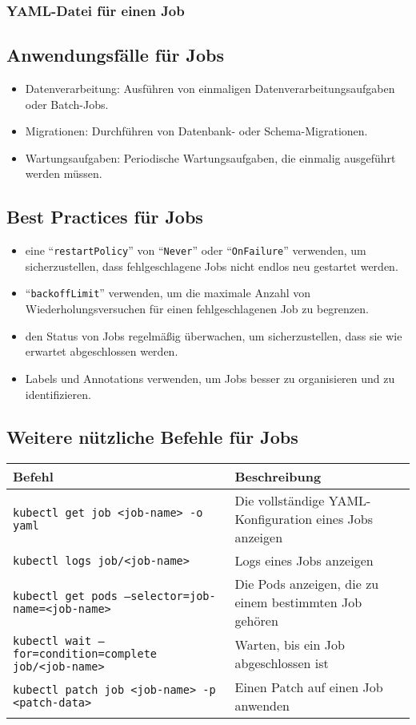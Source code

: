 \subsubsection{YAML-Datei für einen Job}


\subsection{Anwendungsfälle für Jobs}
\begin{itemize}
    \item Datenverarbeitung: Ausführen von einmaligen Datenverarbeitungsaufgaben oder Batch-Jobs.
    \item Migrationen: Durchführen von Datenbank- oder Schema-Migrationen.
    \item Wartungsaufgaben: Periodische Wartungsaufgaben, die einmalig ausgeführt werden müssen.
\end{itemize}

\subsection{Best Practices für Jobs}
\begin{itemize}
    \item eine \enquote{\texttt{restartPolicy}} von \enquote{\texttt{Never}} oder \enquote{\texttt{OnFailure}} verwenden, um sicherzustellen, dass fehlgeschlagene Jobs nicht endlos neu gestartet werden.
    \item \enquote{\texttt{backoffLimit}} verwenden, um die maximale Anzahl von Wiederholungsversuchen für einen fehlgeschlagenen Job zu begrenzen.
    \item den Status von Jobs regelmäßig überwachen, um sicherzustellen, dass sie wie erwartet abgeschlossen werden.
    \item Labels und Annotations verwenden, um Jobs besser zu organisieren und zu identifizieren.
\end{itemize}

\subsection{Weitere nützliche Befehle für Jobs}
\begin{tabular}{|p{}|p{}|}
\hline
\textbf{Befehl} & \textbf{Beschreibung} \\
\hline
\texttt{kubectl get job <job-name> -o yaml} & Die vollständige YAML-Konfiguration eines Jobs anzeigen \\
\texttt{kubectl logs job/<job-name>} & Logs eines Jobs anzeigen \\
\texttt{kubectl get pods --selector=job-name=<job-name>} & Die Pods anzeigen, die zu einem bestimmten Job gehören \\
\texttt{kubectl wait --for=condition=complete job/<job-name>} & Warten, bis ein Job abgeschlossen ist \\
\texttt{kubectl patch job <job-name> -p <patch-data>} & Einen Patch auf einen Job anwenden \\
\hline
\end{tabular}

